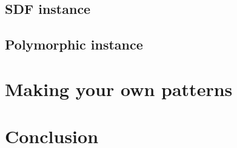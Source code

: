\documentclass{article}
\begin{document}
\subsection{SDF instance}
\label{sec:sdf-instance}


\subsection{Polymorphic instance}
\label{sec:poly-instance}


\section{Making your own patterns}
\label{sec:making-your-own}


\section{Conclusion}
\label{sec:conclusion}


\printbibliography
\end{document}
